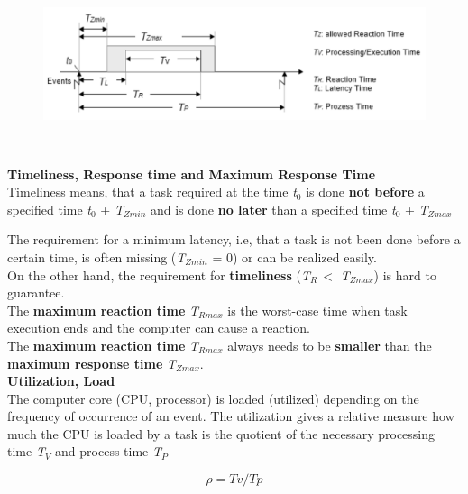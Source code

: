 	\begin{figure}[h]
    \centering
    \includegraphics[width=15cm, height=5cm]{Images/image75.png}
    \label{fig:Fig 21}
    \end{figure}
\os{\newpage}
\nsl{\newpage}
\textbf{Timeliness, Response time and Maximum Response Time}\\

Timeliness means, that a task required at the time \textit{t}${}_{0}$ is done \textbf{not before} a specified time \textit{t}${}_{0}$ + \textit{T${}_{Zmin}$} and is done \textbf{no later} than a specified time \textit{t}${}_{0}$ + \textit{T${}_{Zmax}$}


The requirement for a minimum latency, i.e, that a task is not been done before a certain time, is often missing (\textit{T${}_{Zmin}$} = 0) or can be realized easily.\\ 

On the other hand, the requirement for \textbf{timeliness} (\textit{T${}_{R\ }$}$\mathrm{<}$ \textit{T${}_{Zmax}$}) is hard to guarantee. \\

The \textbf{maximum reaction time} \textit{T${}_{Rmax}$} is the worst-case time when task execution ends and the computer can cause a reaction. \\

The \textbf{maximum reaction time} \textit{T${}_{Rmax}$} always needs to be \textbf{smaller} than the \textbf{maximum response time} \textit{T${}_{Zmax}$}.\\

{\rot\bf Utilization, Load}\\

The computer core (CPU, processor) is loaded (utilized) depending on the frequency of occurrence of an event. The utilization  gives a relative measure how much the CPU is loaded by a task is the quotient of the necessary processing time \textit{T${}_{V}$} and process time \textit{T${}_{P}$}

\begin{equation}
	\rho = Tv/Tp
\label{EQ 2}
\end{equation}
	
